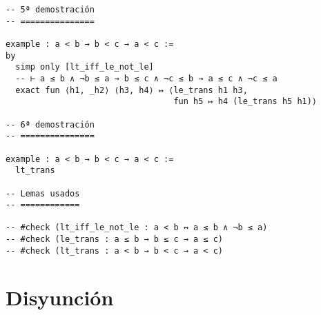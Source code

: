 \begin{verbatim}
-- 5ª demostración
-- ===============

example : a < b → b < c → a < c :=
by
  simp only [lt_iff_le_not_le]
  -- ⊢ a ≤ b ∧ ¬b ≤ a → b ≤ c ∧ ¬c ≤ b → a ≤ c ∧ ¬c ≤ a
  exact fun ⟨h1, _h2⟩ ⟨h3, h4⟩ ↦ ⟨le_trans h1 h3,
                                  fun h5 ↦ h4 (le_trans h5 h1)⟩

-- 6ª demostración
-- ===============

example : a < b → b < c → a < c :=
  lt_trans

-- Lemas usados
-- ============

-- #check (lt_iff_le_not_le : a < b ↔ a ≤ b ∧ ¬b ≤ a)
-- #check (le_trans : a ≤ b → b ≤ c → a ≤ c)
-- #check (lt_trans : a < b → b < c → a < c)
\end{verbatim}

\section{Disyunción}
\label{sec:org57cb717}

